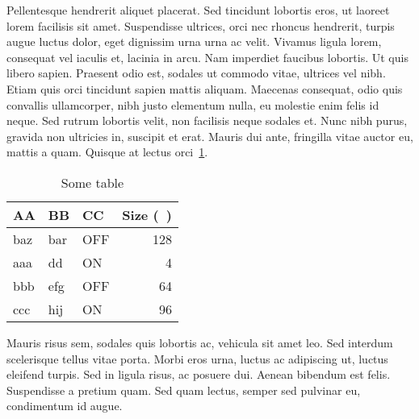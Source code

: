 Pellentesque hendrerit aliquet placerat. Sed tincidunt lobortis eros, ut laoreet
lorem facilisis sit amet. Suspendisse ultrices, orci nec rhoncus hendrerit,
turpis augue luctus dolor, eget dignissim urna urna ac velit. Vivamus ligula
lorem, consequat vel iaculis et, lacinia in arcu. Nam imperdiet faucibus
lobortis. Ut quis libero sapien. Praesent odio est, sodales ut commodo vitae,
ultrices vel nibh. Etiam quis orci tincidunt sapien mattis aliquam. Maecenas
consequat, odio quis convallis ullamcorper, nibh justo elementum nulla, eu
molestie enim felis id neque. Sed rutrum lobortis velit, non facilisis neque
sodales et. Nunc nibh purus, gravida non ultricies in, suscipit et erat. Mauris
dui ante, fringilla vitae auctor eu, mattis a quam. Quisque at lectus
orci~\ref{table:sometable}.

\begin{table}[ht]
	\begin{center}
		\caption{Some table}
		\begin{tabular}{@{}lllr@{}}
			\toprule
			AA & BB & CC & Size (\si{\kilo\byte})  \\
			\midrule
			baz & bar & OFF & 128 \\
			aaa & dd & ON & 4 \\
			bbb & efg & OFF & 64 \\
			ccc & hij & ON & 96 \\
			\bottomrule
		\end{tabular}
		\label{table:sometable}
	\end{center}
\end{table}

Mauris risus sem, sodales quis lobortis ac, vehicula sit amet leo. Sed interdum
scelerisque tellus vitae porta. Morbi eros urna, luctus ac adipiscing ut, luctus
eleifend turpis. Sed in ligula risus, ac posuere dui. Aenean bibendum est felis.
Suspendisse a pretium quam. Sed quam lectus, semper sed pulvinar eu, condimentum
id augue.~\cite{Doe:2009}


